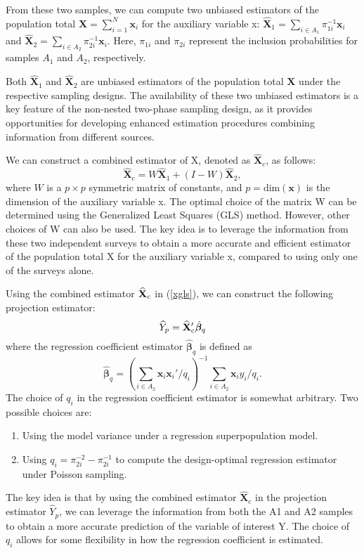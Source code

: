 \documentclass[12pt]{article}
\newcommand{\bx}{\mathbf{x}}
\begin{document}
From these two samples, we can compute two unbiased estimators of the population total $\mathbf{X} = \sum_{i=1}^N \bx_i$ for the auxiliary variable x: $\hat{\mathbf{X}}_1 = \sum_{i \in A_1} \pi_{1i}^{-1} \bx_i$
and 
$\hat{\mathbf{X}}_2 = \sum_{i \in A_2} \pi_{2i}^{-1} \bx_i$. 
Here, $\pi_{1i}$ and $\pi_{2i}$ represent the inclusion probabilities for samples $A_1$ and $A_2$, respectively.

Both $\hat{\mathbf{X}}_1$ and $\hat{\mathbf{X}}_2$ are unbiased estimators of the population total $\mathbf{X}$ under the respective sampling designs. 
The availability of these two unbiased estimators is a key feature of the non-nested two-phase sampling design, as it provides opportunities for developing enhanced estimation procedures combining information from different sources.  

We can  construct a combined estimator of X, denoted as $\widehat{\mathbf{X}}_c$, as follows:
\begin{equation}
\widehat{\mathbf{X}}_c = W \hat{\mathbf{X}}_1 + (I - W) \hat{\mathbf{X}}_2, 
\label{xgls}
\end{equation}
where $W$ is a $p \times p$ symmetric matrix of constants, and $p = \text{dim}(\bx)$ is the dimension of the auxiliary variable x. The optimal choice of the matrix W can be determined using the Generalized Least Squares (GLS) method. However, other choices of W can also be used. The key idea is to leverage the information from these two independent surveys to obtain a more accurate and efficient estimator of the population total X for the auxiliary variable x, compared to using only one of the surveys alone. 


Using the combined estimator  $\widehat{\mathbf{X}}_{\rm c} $ in (\ref{xgls}), we can construct the following projection estimator:  
\begin{equation}
 \widehat{Y}_p = \widehat{\mathbf{X}}_{\rm c}' \hat{\bm \beta}_q  
 \label{11-proj}
 \end{equation}
where the regression coefficient estimator $\hat{\bm \beta}_q$ is defined as 
$$ 
\hat{\bm \beta}_q = \left( \sum_{i \in A_2} \bx_i \bx_i' / q_i \right)^{-1} 
\sum_{i \in A_2} \bx_i y_i / q_i. 
$$
The choice of $q_i$ in the regression coefficient estimator is somewhat arbitrary. Two possible choices are:
\begin{enumerate}
\item Using the model variance under a regression superpopulation model.
\item Using $q_i = \pi_{2i}^{-2} - \pi_{2i}^{-1}$ to compute the design-optimal regression estimator under Poisson sampling.
\end{enumerate}
The key idea is that by using the combined estimator $\widehat{\mathbf{X}}_c$ in the projection estimator $\widehat{Y}_p$, we can leverage the information from both the A1 and A2 samples to obtain a more accurate prediction of the variable of interest Y. The choice of $q_i$ allows for some flexibility in how the regression coefficient is estimated.
\end{document}
